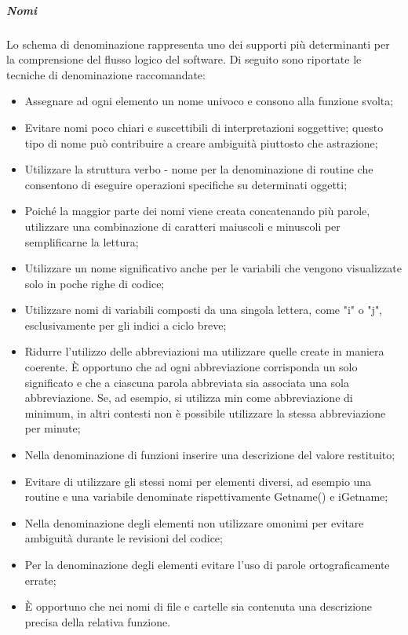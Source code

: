 \documentclass[../NormeDiProgetto_v3.0.0.tex]{subfiles}
\begin{document}
                  \subparagraph{Nomi}
                  Lo schema di denominazione rappresenta uno dei supporti più determinanti per la comprensione del flusso logico del software. Di seguito sono riportate le tecniche di denominazione raccomandate:
                  \begin{itemize}
                        \item Assegnare ad ogni elemento un nome univoco e consono alla funzione svolta;
                        \item Evitare nomi poco chiari e suscettibili di interpretazioni soggettive; questo tipo di nome può contribuire a creare ambiguità piuttosto che astrazione;
                        \item Utilizzare la struttura verbo - nome per la denominazione di routine che consentono di eseguire operazioni specifiche su determinati oggetti;
                        \item Poiché la maggior parte dei nomi viene creata concatenando più parole, utilizzare una combinazione di caratteri maiuscoli e minuscoli per semplificarne la lettura;
                        \item Utilizzare un nome significativo anche per le variabili che vengono visualizzate solo in poche righe di codice;
                        \item Utilizzare nomi di variabili composti da una singola lettera, come "i" o "j", esclusivamente per gli indici a ciclo breve;
                        \item Ridurre l'utilizzo delle abbreviazioni ma utilizzare quelle create in maniera coerente. È opportuno che ad ogni abbreviazione corrisponda un solo significato e che a ciascuna parola abbreviata sia associata una sola abbreviazione. Se, ad esempio, si utilizza min come abbreviazione di minimum, in altri contesti non è possibile utilizzare la stessa abbreviazione per minute;
                        \item Nella denominazione di funzioni inserire una descrizione del valore restituito;
                        \item Evitare di utilizzare gli stessi nomi per elementi diversi, ad esempio una routine e una variabile denominate rispettivamente Getname() e iGetname;
                        \item Nella denominazione degli elementi non utilizzare omonimi per evitare ambiguità durante le revisioni del codice;
                        \item Per la denominazione degli elementi evitare l'uso di parole ortograficamente errate;
                        \item È opportuno che nei nomi di file e cartelle sia contenuta una descrizione precisa della relativa funzione.
                  \end{itemize}
\end{document}
